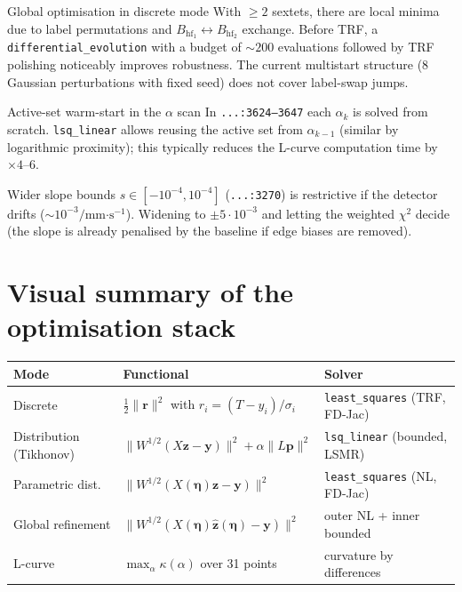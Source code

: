 \documentclass[11pt,a4paper]{article}
\newcommand{\BHF}{B_{\mathrm{hf}}}
\newcommand{\code}[1]{\texttt{\small #1}}
\newcommand{\file}[1]{\textcolor{black!70}{\texttt{\small #1}}}
\begin{document}
\begin{mejora}{Global optimisation in discrete mode}\label{mej:global}
With $\ge 2$ sextets, there are local minima due to label permutations and $\BHF_1\leftrightarrow\BHF_2$ exchange. Before TRF, a \code{differential\_evolution} with a budget of $\sim 200$ evaluations followed by TRF polishing noticeably improves robustness. The current multistart structure (8 Gaussian perturbations with fixed seed) does not cover label-swap jumps.
\end{mejora}

\begin{mejora}{Active-set warm-start in the $\alpha$ scan}\label{mej:warm}
In \file{...:3624--3647} each $\alpha_k$ is solved from scratch. \code{lsq\_linear} allows reusing the active set from $\alpha_{k-1}$ (similar by logarithmic proximity); this typically reduces the L-curve computation time by $\times 4$--$6$.
\end{mejora}

\begin{mejora}{Wider slope bounds}\label{mej:slope}
$s\in[-10^{-4},10^{-4}]$ (\file{...:3270}) is restrictive if the detector drifts ($\sim 10^{-3}/\text{mm·s}^{-1}$). Widening to $\pm 5\cdot 10^{-3}$ and letting the weighted $\chi^{2}$ decide (the slope is already penalised by the baseline if edge biases are removed).
\end{mejora}

\section{Visual summary of the optimisation stack}

\begin{center}
\begin{tabular}{@{}lll@{}}
\toprule
\textbf{Mode} & \textbf{Functional} & \textbf{Solver} \\
\midrule
Discrete & $\tfrac12\|\bm r\|^{2}$ with $r_i=(T-y_i)/\sigma_i$ & \code{least\_squares} (TRF, FD-Jac) \\
Distribution (Tikhonov) & $\|W^{1/2}(X\bm z-\bm y)\|^{2}+\alpha\|L\bm p\|^{2}$ & \code{lsq\_linear} (bounded, LSMR) \\
Parametric dist. & $\|W^{1/2}(X(\bm\eta)\bm z-\bm y)\|^{2}$ & \code{least\_squares} (NL, FD-Jac) \\
Global refinement & $\|W^{1/2}(X(\bm\eta)\hat{\bm z}(\bm\eta)-\bm y)\|^{2}$ & outer NL + inner bounded \\
L-curve & $\max_\alpha\kappa(\alpha)$ over 31 points & curvature by differences \\
\bottomrule
\end{tabular}
\end{center}
\end{document}
